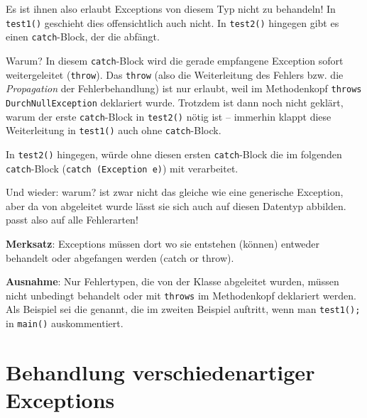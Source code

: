 Es ist ihnen also erlaubt Exceptions von diesem Typ nicht zu behandeln! In
\lstinline|test1()| geschieht dies offensichtlich auch nicht. In
\lstinline|test2()| hingegen gibt es einen \lstinline|catch|-Block, der die
 abfängt.

Warum? In diesem \lstinline|catch|-Block wird die gerade empfangene Exception
sofort weitergeleitet (\lstinline|throw|). Das \lstinline|throw| (also die
Weiterleitung des Fehlers bzw. die {\em Propagation} der Fehlerbehandlung)
ist nur erlaubt, weil im Methodenkopf \lstinline|throws DurchNullException|
deklariert wurde. Trotzdem ist dann noch nicht geklärt, warum der erste
\lstinline|catch|-Block in \lstinline|test2()| nötig ist -- immerhin klappt
diese Weiterleitung in \lstinline|test1()| auch ohne \lstinline|catch|-Block.

In \lstinline|test2()| hingegen, würde ohne diesen ersten
\lstinline|catch|-Block die  im folgenden
\lstinline|catch|-Block (\lstinline|catch (Exception e)|) mit \glqq
verarbeitet\grqq .

Und wieder: warum?  ist zwar nicht das gleiche wie
eine generische Exception, aber da  von
 abgeleitet wurde lässt sie sich auch auf diesen Datentyp
abbilden.  passt also auf alle Fehlerarten!

\textbf{Merksatz}: Exceptions müssen dort wo sie entstehen (können) entweder
behandelt oder abgefangen werden (\glqq catch or throw\grqq ).

\textbf{Ausnahme}: Nur Fehlertypen, die von der Klasse
 abgeleitet wurden, müssen nicht unbedingt behandelt
oder mit \lstinline|throws| im Methodenkopf deklariert werden. Als Beispiel sei
die  genannt,  die im zweiten Beispiel auftritt,
wenn man \lstinline|test1();| in \lstinline|main()| auskommentiert.


\section{Behandlung verschiedenartiger Exceptions}


